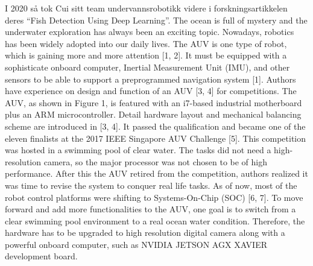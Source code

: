I 2020 så tok Cui sitt team undervannsrobotikk videre i forskningsartikkelen deres ``Fish Detection Using Deep Learning''. The ocean is full of mystery and the underwater exploration has always been an exciting topic. Nowadays, robotics has been widely adopted into our daily lives. The AUV is one type of robot, which is gaining more and more attention [1, 2]. It must be equipped with a sophisticate onboard computer, Inertial Measurement Unit (IMU), and other sensors to be able to support a preprogrammed navigation system [1]. Authors have experience on design and function of an AUV [3, 4] for competitions. The AUV, as shown in Figure 1, is featured with an i7-based industrial motherboard plus an ARM microcontroller. Detail hardware layout and mechanical balancing scheme are introduced in [3, 4]. It passed the qualiﬁcation and became one of the eleven ﬁnalists at the 2017 IEEE Singapore AUV Challenge [5]. This competition was hosted in a swimming pool of clear water. The tasks did not need a high-resolution camera, so the major processor was not chosen to be of 
high performance. After this the AUV retired from the competition, authors realized it was time to revise the system to conquer real life tasks. As of now, most of the robot control platforms were shifting to Systems-On-Chip (SOC) [6, 7]. To move forward and add more functionalities to the AUV, one goal is to switch from a clear swimming pool environment to a real ocean water condition. Therefore, the hardware has to be upgraded to high resolution digital camera along with a powerful onboard computer, such as NVIDIA JETSON AGX XAVIER development board. \cite{Cui m.fl. 2020}


